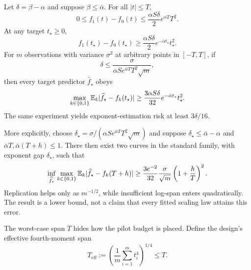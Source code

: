\begin{theorem}
\label{thm:matched}
Let $\delta=\beta-\alpha$ and suppose $\beta\le\bar\alpha$. For all $|t|\le T$,
\begin{equation}
 0\le f_1(t)-f_0(t)
 \le \frac{\alpha S\delta}{2}e^{\bar\alpha T}T^2.
 \label{eq:observed-gap}
\end{equation}
At any target $t_\star\ge0$,
\begin{equation}
 f_1(t_\star)-f_0(t_\star)
 \ge \frac{\alpha S\delta}{2}e^{-\bar\alpha t_\star}t_\star^2.
 \label{eq:target-gap}
\end{equation}
For $m$ observations with variance $\sigma^2$ at arbitrary points in $[-T,T]$, if
\begin{equation}
 \delta\le
 \frac{\sigma}{\alpha S e^{\bar\alpha T}T^2\sqrt m},
 \label{eq:delta-choice}
\end{equation}
then every target predictor $\widehat f_\star$ obeys
\begin{equation}
 \max_{k\in\{0,1\}}
 \mathbb{E}_k|\widehat f_\star-f_k(t_\star)|
 \ge \frac{3\alpha S\delta}{32}
 e^{-\bar\alpha t_\star}t_\star^2.
 \label{eq:target-lower}
\end{equation}
The same experiment yields exponent-estimation risk at least $3\delta/16$.
\end{theorem}

More explicitly, choose
$\delta_\star=\sigma/(\alpha S e^{\bar\alpha T}T^2\sqrt m)$
and suppose $\delta_\star\le\bar\alpha-\alpha$ and
$\bar\alpha T,\bar\alpha(T+h)\le1$. There then exist two curves in the standard family, with exponent gap $\delta_\star$, such that
\begin{equation}
 \inf_{\widehat f_\star}\max_{k\in\{0,1\}}
 \mathbb{E}_k|\widehat f_\star-f_k(T+h)|
 \ge \frac{3e^{-2}}{32}\frac{\sigma}{\sqrt m}
 \left(1+\frac{h}{T}\right)^2.
 \label{eq:horizon-ratio}
\end{equation}
Replication helps only as $m^{-1/2}$, while insufficient log-span enters quadratically. The result is a lower bound, not a claim that every fitted scaling law attains this error.

The worst-case span $T$ hides how the pilot budget is placed. Define the design's effective fourth-moment span
\begin{equation}
 T_{\mathrm{eff}}:=\left(\frac1m\sum_{i=1}^m t_i^4\right)^{1/4}\le T.
 \label{eq:effective-span}
\end{equation}

